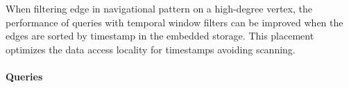 
When filtering edge in navigational pattern on a high-degree vertex, the performance of queries with temporal window filters can be improved when the edges are sorted by timestamp in the embedded storage. This placement optimizes the data access locality for timestamps avoiding scanning.


\paragraph{Queries}
{\raggedright

}